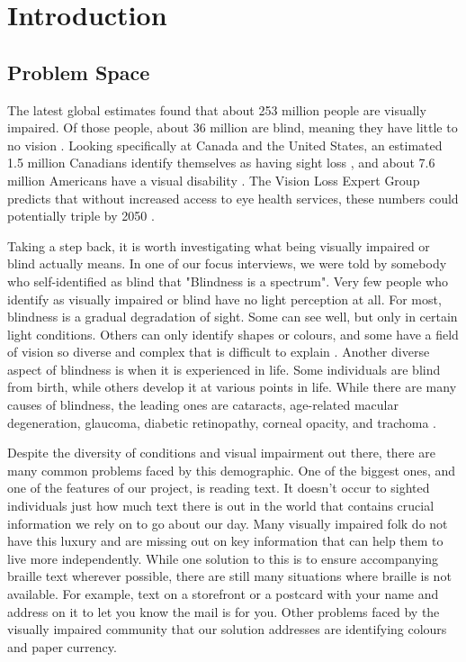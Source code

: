 \documentclass[a4paper,11pt]{article}
\begin{document}
\newpage

\tableofcontents

\newpage

\section{Introduction}
\subsection{Problem Space}
The latest global estimates found that about 253 million people are visually impaired. Of those people, about 36 million are blind, meaning they have little to no vision \cite{orbis-global-blind-data}. Looking specifically at Canada and the United States, an estimated 1.5 million Canadians identify themselves as having sight loss \cite{cnib-blind-data}, and about 7.6 million Americans have a visual disability \cite{nfb-blind-data}. The Vision Loss Expert Group predicts that without increased access to eye health services, these numbers could potentially triple by 2050 \cite{orbis-global-blind-data}.

Taking a step back, it is worth investigating what being visually impaired or blind actually means. In one of our focus interviews, we were told by somebody who self-identified as blind that "Blindness is a spectrum". Very few people who identify as visually impaired or blind have no light perception at all. For most, blindness is a gradual degradation of sight. Some can see well, but only in certain light conditions. Others can only identify shapes or colours, and some have a field of vision so diverse and complex that is difficult to explain \cite{lighthouse-sf-info-page}. Another diverse aspect of blindness is when it is experienced in life. Some individuals are blind from birth, while others develop it at various points in life. While there are many causes of blindness, the leading ones are cataracts, age-related macular degeneration, glaucoma, diabetic retinopathy, corneal opacity, and trachoma \cite{WHO-blindness}.

Despite the diversity of conditions and visual impairment out there, there are many common problems faced by this demographic. One of the biggest ones, and one of the features of our project, is reading text. It doesn't occur to sighted individuals just how much text there is out in the world that contains crucial information we rely on to go about our day. Many visually impaired folk do not have this luxury and are missing out on key information that can help them to live more independently. While one solution to this is to ensure accompanying braille text wherever possible, there are still many situations where braille is not available. For example, text on a storefront or a postcard with your name and address on it to let you know the mail is for you. Other problems faced by the visually impaired community that our solution addresses are identifying colours and paper currency.
\end{document}

